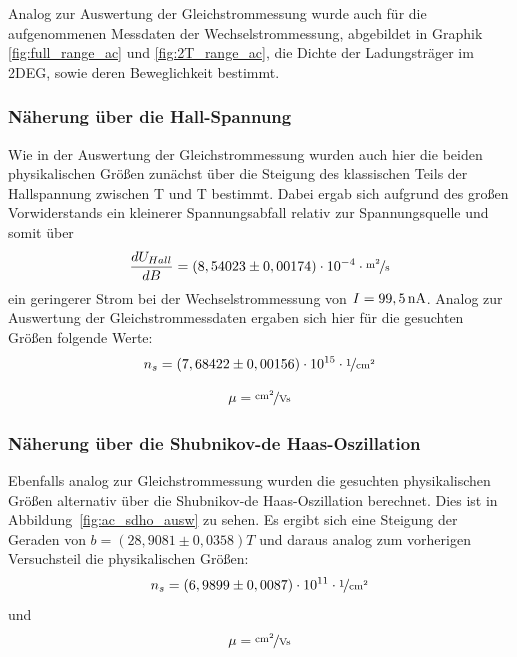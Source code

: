 

Analog zur Auswertung der Gleichstrommessung wurde auch für die aufgenommenen Messdaten der Wechselstrommessung, abgebildet in Graphik \ref{fig:full_range_ac} und \ref{fig:2T_range_ac}, die Dichte der Ladungsträger im 2DEG, sowie deren Beweglichkeit bestimmt.

\subsubsection{Näherung über die Hall-Spannung}
\label{ch:naeherung_hall2}

Wie in der Auswertung der Gleichstrommessung wurden auch hier die beiden physikalischen Größen zunächst über die Steigung des klassischen Teils der Hallspannung zwischen \unit[-2]{T} und \unit[2]{T} bestimmt. Dabei ergab sich aufgrund des großen Vorwiderstands ein kleinerer Spannungsabfall relativ zur Spannungsquelle und somit über
\begin{equation}
	\d{U_{Hall}}{B} = ( 8,54023 \pm 0,00174 ) \cdot 10^{-4} \cdot \unitfrac{m^2}{s}
\end{equation}%
ein geringerer Strom bei der Wechselstrommessung von $I=\unit[99,5]{nA}$. Analog zur Auswertung der Gleichstrommessdaten ergaben sich hier für die gesuchten Größen folgende Werte: 
\begin{equation}
n_s=  ( 7,68422 \pm 0,00156) \cdot 10^{15} \cdot \unitfrac{1}{cm^2}
\end{equation}  %

\begin{equation}
\mu= \unitfrac{cm^2}{Vs}   %
\end{equation}
 


\subsubsection{Näherung über die Shubnikov-de Haas-Oszillation}
\label{ch:naeherung_ac}

Ebenfalls analog zur Gleichstrommessung wurden die gesuchten physikalischen Größen alternativ über die Shubnikov-de Haas-Oszillation berechnet. Dies ist in Abbildung~\ref{fig:ac_sdho_ausw} zu sehen. 
Es ergibt sich eine Steigung der Geraden von $b=(28,9081 \pm 0,0358)\unit{T}$ und daraus analog zum vorherigen Versuchsteil die physikalischen Größen: 
\begin{equation}
n_s= (6,9899 \pm 0,0087)\cdot 10^{11} \cdot \unitfrac{1}{cm^2}
\end{equation}
und 
\begin{equation}
\mu= \unitfrac{cm^2}{Vs}   %
\end{equation} 
   
